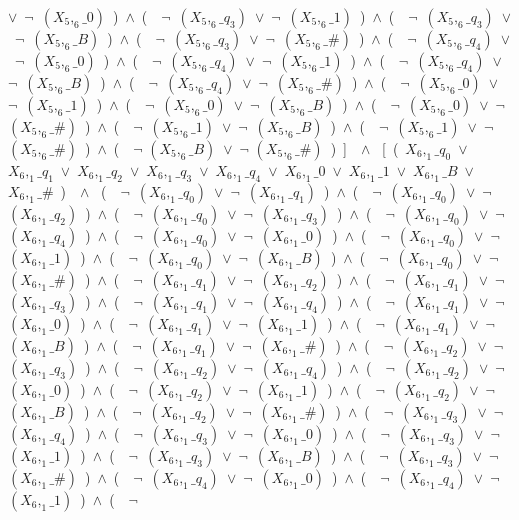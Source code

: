﻿\documentclass[a4paper,10pt]{article}
\begin{document}
$\vee$\ $\neg$\ $(X_5,_6\_0)$\ )\ $\wedge$\ (\ \ $\neg$\ $(X_5,_6\_q_3)$\ $\vee$\ $\neg$\ $(X_5,_6\_1)$\ )\ $\wedge$\ (\ \ $\neg$\ $(X_5,_6\_q_3)$\ $\vee$\ $\neg$\ $(X_5,_6\_B)$\ )\ $\wedge$\ (\ \ $\neg$\ $(X_5,_6\_q_3)$\ $\vee$\ $\neg$\ $(X_5,_6\_\#)$\ )\ $\wedge$\ (\ \ $\neg$\ $(X_5,_6\_q_4)$\ $\vee$\ $\neg$\ $(X_5,_6\_0)$\ )\ $\wedge$\ (\ \ $\neg$\ $(X_5,_6\_q_4)$\ $\vee$\ $\neg$\ $(X_5,_6\_1)$\ )\ $\wedge$\ (\ \ $\neg$\ $(X_5,_6\_q_4)$\ $\vee$\ $\neg$\ $(X_5,_6\_B)$\ )\ $\wedge$\ (\ \ $\neg$\ $(X_5,_6\_q_4)$\ $\vee$\ $\neg$\ $(X_5,_6\_\#)$\ )\ $\wedge$\ (\ \ $\neg$\ $(X_5,_6\_0)$\ $\vee$\ $\neg$\ $(X_5,_6\_1)$\ )\ $\wedge$\ (\ \ $\neg$\ $(X_5,_6\_0)$\ $\vee$\ $\neg$\ $(X_5,_6\_B)$\ )\ $\wedge$\ (\ \ $\neg$\ $(X_5,_6\_0)$\ $\vee$\ $\neg$\ $(X_5,_6\_\#)$\ )\ $\wedge$\ (\ \ $\neg$\ $(X_5,_6\_1)$\ $\vee$\ $\neg$\ $(X_5,_6\_B)$\ )\ $\wedge$\ (\ \ $\neg$\ $(X_5,_6\_1)$\ $\vee$\ $\neg$\ $(X_5,_6\_\#)$\ )\ $\wedge$\ (\ \ $\neg$ $(X_5,_6\_B)$\ $\vee$\ $\neg$ $(X_5,_6\_\#)$\ )\ ]\ \ $\wedge$ \ [\ (\ $X_6,_1\_q_0$\ $\vee$\ $X_6,_1\_q_1$\ $\vee$\ $X_6,_1\_q_2$\ $\vee$\ $X_6,_1\_q_3$\ $\vee$\ $X_6,_1\_q_4$\ $\vee$\ $X_6,_1\_0$\ $\vee$\ $X_6,_1\_1$\ $\vee$\ $X_6,_1\_B$\ $\vee$\ $X_6,_1\_\#$\ )\ \ $\wedge$ \ (\ \ $\neg$\ $(X_6,_1\_q_0)$\ $\vee$\ $\neg$\ $(X_6,_1\_q_1)$\ )\ $\wedge$\ (\ \ $\neg$\ $(X_6,_1\_q_0)$\ $\vee$\ $\neg$\ $(X_6,_1\_q_2)$\ )\ $\wedge$\ (\ \ $\neg$\ $(X_6,_1\_q_0)$\ $\vee$\ $\neg$\ $(X_6,_1\_q_3)$\ )\ $\wedge$\ (\ \ $\neg$\ $(X_6,_1\_q_0)$\ $\vee$\ $\neg$\ $(X_6,_1\_q_4)$\ )\ $\wedge$\ (\ \ $\neg$\ $(X_6,_1\_q_0)$\ $\vee$\ $\neg$\ $(X_6,_1\_0)$\ )\ $\wedge$\ (\ \ $\neg$\ $(X_6,_1\_q_0)$\ $\vee$\ $\neg$\ $(X_6,_1\_1)$\ )\ $\wedge$\ (\ \ $\neg$\ $(X_6,_1\_q_0)$\ $\vee$\ $\neg$\ $(X_6,_1\_B)$\ )\ $\wedge$\ (\ \ $\neg$\ $(X_6,_1\_q_0)$\ $\vee$\ $\neg$\ $(X_6,_1\_\#)$\ )\ $\wedge$\ (\ \ $\neg$\ $(X_6,_1\_q_1)$\ $\vee$\ $\neg$\ $(X_6,_1\_q_2)$\ )\ $\wedge$\ (\ \ $\neg$\ $(X_6,_1\_q_1)$\ $\vee$\ $\neg$\ $(X_6,_1\_q_3)$\ )\ $\wedge$\ (\ \ $\neg$\ $(X_6,_1\_q_1)$\ $\vee$\ $\neg$\ $(X_6,_1\_q_4)$\ )\ $\wedge$\ (\ \ $\neg$\ $(X_6,_1\_q_1)$\ $\vee$\ $\neg$\ $(X_6,_1\_0)$\ )\ $\wedge$\ (\ \ $\neg$\ $(X_6,_1\_q_1)$\ $\vee$\ $\neg$\ $(X_6,_1\_1)$\ )\ $\wedge$\ (\ \ $\neg$\ $(X_6,_1\_q_1)$\ $\vee$\ $\neg$\ $(X_6,_1\_B)$\ )\ $\wedge$\ (\ \ $\neg$\ $(X_6,_1\_q_1)$\ $\vee$\ $\neg$\ $(X_6,_1\_\#)$\ )\ $\wedge$\ (\ \ $\neg$\ $(X_6,_1\_q_2)$\ $\vee$\ $\neg$\ $(X_6,_1\_q_3)$\ )\ $\wedge$\ (\ \ $\neg$\ $(X_6,_1\_q_2)$\ $\vee$\ $\neg$\ $(X_6,_1\_q_4)$\ )\ $\wedge$\ (\ \ $\neg$\ $(X_6,_1\_q_2)$\ $\vee$\ $\neg$\ $(X_6,_1\_0)$\ )\ $\wedge$\ (\ \ $\neg$\ $(X_6,_1\_q_2)$\ $\vee$\ $\neg$\ $(X_6,_1\_1)$\ )\ $\wedge$\ (\ \ $\neg$\ $(X_6,_1\_q_2)$\ $\vee$\ $\neg$\ $(X_6,_1\_B)$\ )\ $\wedge$\ (\ \ $\neg$\ $(X_6,_1\_q_2)$\ $\vee$\ $\neg$\ $(X_6,_1\_\#)$\ )\ $\wedge$\ (\ \ $\neg$\ $(X_6,_1\_q_3)$\ $\vee$\ $\neg$\ $(X_6,_1\_q_4)$\ )\ $\wedge$\ (\ \ $\neg$\ $(X_6,_1\_q_3)$\ $\vee$\ $\neg$\ $(X_6,_1\_0)$\ )\ $\wedge$\ (\ \ $\neg$\ $(X_6,_1\_q_3)$\ $\vee$\ $\neg$\ $(X_6,_1\_1)$\ )\ $\wedge$\ (\ \ $\neg$\ $(X_6,_1\_q_3)$\ $\vee$\ $\neg$\ $(X_6,_1\_B)$\ )\ $\wedge$\ (\ \ $\neg$\ $(X_6,_1\_q_3)$\ $\vee$\ $\neg$\ $(X_6,_1\_\#)$\ )\ $\wedge$\ (\ \ $\neg$\ $(X_6,_1\_q_4)$\ $\vee$\ $\neg$\ $(X_6,_1\_0)$\ )\ $\wedge$\ (\ \ $\neg$\ $(X_6,_1\_q_4)$\ $\vee$\ $\neg$\ $(X_6,_1\_1)$\ )\ $\wedge$\ (\ \ $\neg$\ 
\end{document}
